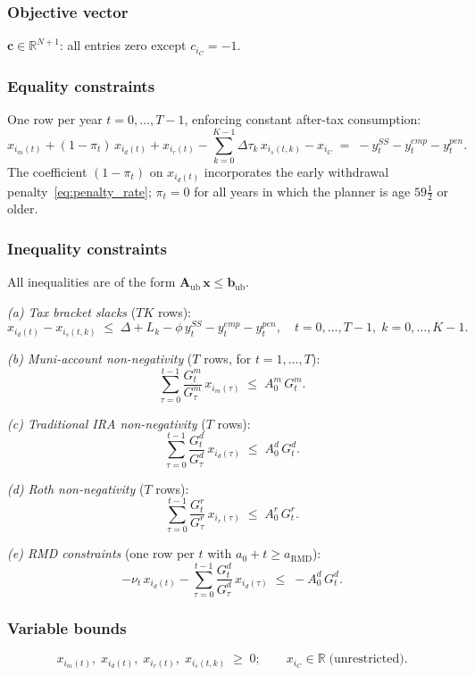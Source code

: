 \documentclass[12pt]{article}
\begin{document}
\subsubsection*{Objective vector}
$\mathbf{c} \in \mathbb{R}^{N+1}$: all entries zero except $c_{i_C} = -1$.

\subsubsection*{Equality constraints}
One row per year $t = 0, \ldots, T-1$, enforcing constant after-tax consumption:
\[
  x_{i_m(t)} + (1-\pi_t)\,x_{i_d(t)} + x_{i_r(t)}
  - \sum_{k=0}^{K-1} \Delta\tau_k\, x_{i_s(t,k)}
  - x_{i_C}
  \;=\; -y^{SS}_t - y^{emp}_t - y^{pen}_t.
\]
The coefficient $(1-\pi_t)$ on $x_{i_d(t)}$ incorporates the early
withdrawal penalty~\eqref{eq:penalty_rate}; $\pi_t = 0$ for all years
in which the planner is age $59\tfrac{1}{2}$ or older.

\subsubsection*{Inequality constraints}
All inequalities are of the form $\mathbf{A}_{\mathrm{ub}}\,\mathbf{x} \leq \mathbf{b}_{\mathrm{ub}}$.

\smallskip
\textit{(a) Tax bracket slacks} ($TK$ rows):
\[
  x_{i_d(t)} - x_{i_s(t,k)} \;\leq\; \Delta + L_k - \phi\,y^{SS}_t - y^{emp}_t - y^{pen}_t,
  \quad t = 0,\ldots,T-1,\; k = 0,\ldots,K-1.
\]

\textit{(b) Muni-account non-negativity} ($T$ rows, for $t = 1, \ldots, T$):
\[
  \sum_{\tau=0}^{t-1} \frac{G^m_t}{G^m_\tau}\,x_{i_m(\tau)}
  \;\leq\; A^m_0\,G^m_t.
\]

\textit{(c) Traditional IRA non-negativity} ($T$ rows):
\[
  \sum_{\tau=0}^{t-1} \frac{G^d_t}{G^d_\tau}\,x_{i_d(\tau)}
  \;\leq\; A^d_0\,G^d_t.
\]

\textit{(d) Roth non-negativity} ($T$ rows):
\[
  \sum_{\tau=0}^{t-1} \frac{G^r_t}{G^r_\tau}\,x_{i_r(\tau)}
  \;\leq\; A^r_0\,G^r_t.
\]

\textit{(e) RMD constraints} (one row per $t$ with $a_0 + t \geq a_{\mathrm{RMD}}$):
\[
  -\nu_t\,x_{i_d(t)}
  - \sum_{\tau=0}^{t-1} \frac{G^d_t}{G^d_\tau}\,x_{i_d(\tau)}
  \;\leq\; -A^d_0\,G^d_t.
\]

\subsubsection*{Variable bounds}
\[
  x_{i_m(t)},\; x_{i_d(t)},\; x_{i_r(t)},\; x_{i_s(t,k)} \;\geq\; 0;
  \qquad x_{i_C} \in \mathbb{R} \;\text{(unrestricted)}.
\]
\end{document}
